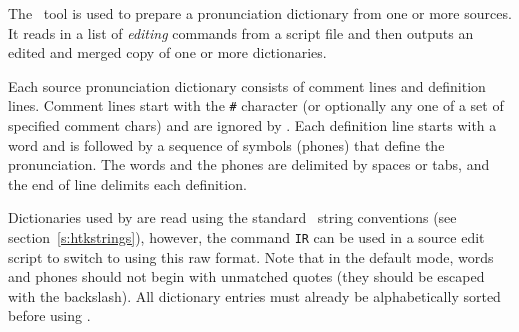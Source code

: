 %
%

\newpage
{}


The \HTK\ tool  is used to prepare a pronunciation dictionary 
from one or more sources.  It
reads in a list of \textit{editing} commands from a
script file and then outputs an edited and merged copy of 
one or more dictionaries.

Each source pronunciation dictionary consists of comment lines and definition
lines.  Comment lines start with the \texttt{\#} character (or optionally any
one of a set of specified comment chars) and are ignored by .
Each definition line starts with a word and is followed by a sequence of
symbols (phones) that define the pronunciation.  The words and the phones are
delimited by spaces or tabs, and the end of line delimits each definition.

Dictionaries used by  are read using the standard \HTK\ string
conventions (see section~\ref{s:htkstrings}), however, the command \texttt{IR}
can be used in a  source edit script to switch to using this raw
format. Note that in the default mode, words and phones should not begin with unmatched quotes (they should be escaped with the backslash). All dictionary entries must already be alphabetically sorted before using .


